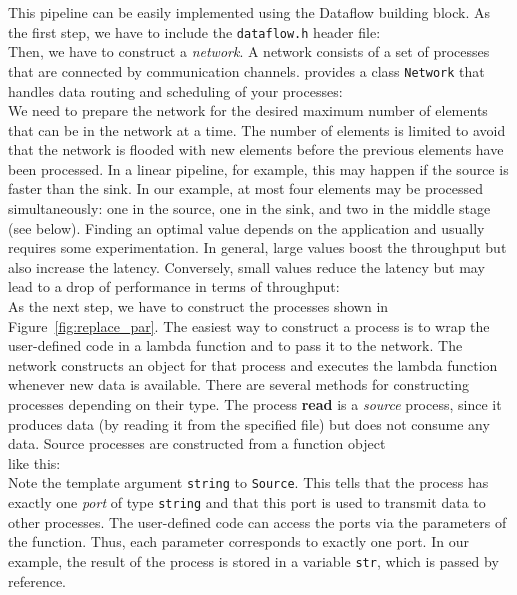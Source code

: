 This pipeline can be easily implemented using the Dataflow building block. As the first step, we have to include the \lstinline|dataflow.h| header file:
%
\\
%
Then, we have to construct a \emph{network}. A network consists of a set of processes that are connected by communication channels.
\embb provides a class \lstinline|Network| that handles data routing and scheduling of your processes:
%
\\
%
We need to prepare the network for the desired maximum number of elements that can be in the network at a time. The number of elements is limited to avoid that the network is flooded with new elements before the previous elements have been processed. In a linear pipeline, for example, this may happen if the source is faster than the sink. In our example, at most four elements may be processed simultaneously: one in the source, one in the sink, and two in the middle stage (see below). Finding an optimal value depends on the application and usually requires some experimentation. In general, large values boost the throughput but also increase the latency. Conversely, small values reduce the latency but may lead to a drop of performance in terms of throughput:
%
\\
%
As the next step, we have to construct the processes shown in Figure~\ref{fig:replace_par}. The easiest way to construct a process is to wrap the user-defined code in a lambda function and to pass it to the network. The network constructs an object for that process and executes the lambda function whenever new data is available. There are several methods for constructing processes depending on their type. The process \textbf{read} is a \emph{source} process, since it produces data (by reading it from the specified file) but does not consume any data. Source processes are constructed from a function object
%
\\
%
like this:
%
\\
%
Note the template argument \lstinline|string| to \lstinline|Source|. This tells \embb that the process has exactly one \emph{port} of type \lstinline|string| and that this port is used to transmit data to other processes. The user-defined code can access the ports via the parameters of the function. Thus, each parameter corresponds to exactly one port. In our example, the result of the process is stored in a variable \lstinline|str|, which is passed by reference.

